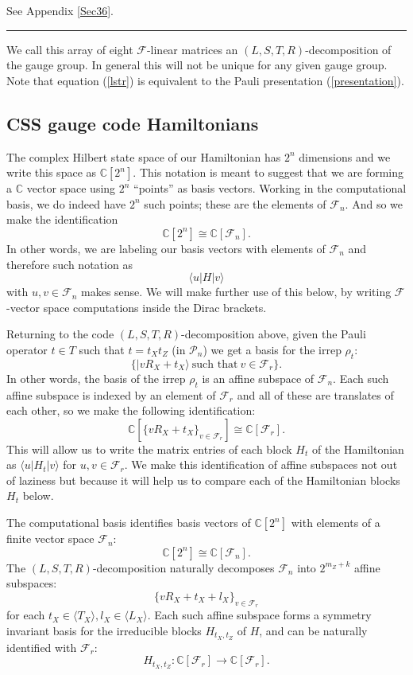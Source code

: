 \documentclass[11pt,oneside]{article}
\newcommand{\Eref}[1]{(\ref{#1})}
\def\Complex{\mathbb{C}}
\def\Pauli{\mathcal{P}}
\newcommand{\ket}[1]{|{#1}\rangle}
\newcommand{\bra}[1]{\langle{#1}|}
\def\Span#1{\langle #1 \rangle}
\newcommand{\Field}{\mathcal{F}}
\def\Fnd{\Field_{n}}
\def\Frd{\Field_{r}}
\renewenvironment{framed}
{\begin{samepage}
\MakeFramed{\hsize0.8\linewidth\advance\hsize-\width\FrameRestore}}
{\endMakeFramed\end{samepage}}
\newcommand\doproof{\vskip 5pt \noindent{\bf \underline{Proof:}\ }}
\newcommand\tombstone{\rule{.36em}{2ex}\vskip 5pt}
\begin{document}
\doproof See Appendix \ref{Sec36}.
\tombstone

We call this array of eight $\Field$-linear 
matrices
an $(L,S,T,R)$-decomposition of the gauge group.
In general this will not be unique for
any given gauge group.
Note that equation \Eref{lstr} is equivalent to the 
Pauli presentation \Eref{presentation}.

\subsection{CSS gauge code Hamiltonians}%

The complex Hilbert state space of our
Hamiltonian has $2^n$ dimensions and we
write this space as $\Complex[2^n]$.
This notation is meant to suggest that
we are forming a $\Complex$ vector space
using $2^n$ ``points'' 
as basis vectors.
Working in the computational basis,
we do indeed have $2^n$ such points; 
these are the elements of $\Fnd.$
And so we make the identification
$$
    \Complex[2^n] \cong \Complex[\Fnd].
$$
In other words, we are labeling 
our basis vectors with elements of $\Fnd$
and therefore such notation as
$$
    \bra{u} H \ket{v}
$$
with $u, v \in \Fnd$ makes sense.
We will make further use of this below,
by writing  $\Field$-vector space 
computations inside the Dirac brackets.

Returning to the code $(L,S,T,R)$-decomposition
above,
given the Pauli operator $t\in T$ such that $t = t_X t_Z$ (in $\Pauli_n$)
we get a basis for the irrep $\rho_t$:
$$
    \{ \ket{v R_X + t_X} \ \mbox{such that}\  v \in \Frd \}.
$$
In other words,
the basis of the irrep $\rho_t$ is 
an affine subspace of $\Fnd.$
Each such affine subspace is indexed by an
element of $\Frd$ and
all of these are
translates of each other,
so we make the following identification:
$$
\Complex[\{vR_X+t_X\}_{v\in\Frd}]
\cong \Complex[\Frd].
$$
This will allow us to write the matrix entries
of each block $H_t$ of the Hamiltonian
as $\bra{u}H_t\ket{v}$ for $u,v\in\Frd.$
We make this identification of affine subspaces
not out of laziness but because it will
help us to compare each of
the Hamiltonian blocks $H_t$ below.

\begin{framed}
\noindent
The computational basis identifies
basis vectors of $\Complex[2^n]$
with elements of a finite vector space $\Fnd$:
$$
    \Complex[2^n] \cong \Complex[\Fnd].
$$
The $(L,S,T,R)$-decomposition naturally
decomposes $\Fnd$ into $2^{m_Z+k}$ affine subspaces:
$$
    \{ v R_X + t_X + l_X \}_{v\in\Frd}
$$
for each $t_X \in \Span{T_X}, l_X \in \Span{L_X}.$
Each such affine subspace forms a
symmetry invariant basis
for the irreducible blocks $H_{t_X,t_Z}$ of $H$,
and can be naturally identified with $\Frd:$
$$
    H_{t_X,t_Z} : \Complex[\Frd] \to \Complex[\Frd].
$$
\end{framed}
\end{document}
